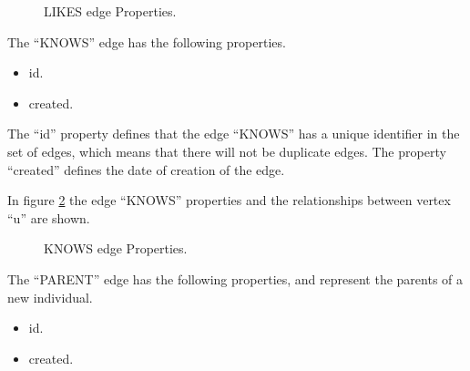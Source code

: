 \documentclass[conference]{IEEEtran}
\begin{document}
\begin{figure}
\captionsetup{justification=centering,margin=2cm}
\centering
\setlength\fboxsep{0pt}
\setlength\fboxrule{0.7pt}
\caption{LIKES edge Properties.}
\label{fig:Likes_edge}       
\end{figure}

The “KNOWS” edge has the following properties.
\begin{itemize} 
\item id. 
\item created. 
\end{itemize}

The “id” property defines that the edge “KNOWS” has a unique identifier in the
set of edges, which means that there will not be duplicate edges. The property
“created” defines the date of creation of the edge.

In figure \ref{fig:Knows_edge} the edge “KNOWS” properties and the relationships between vertex “u”
are shown.

\begin{figure}
\captionsetup{justification=centering,margin=2cm}
\centering
\setlength\fboxsep{0pt}
\setlength\fboxrule{0.7pt}
\caption{KNOWS edge Properties.}
\label{fig:Knows_edge}       
\end{figure}

The “PARENT” edge has the following properties, and represent the parents of a new individual.
\begin{itemize} 
\item id. 
\item created. 
\end{itemize}
\end{document}
